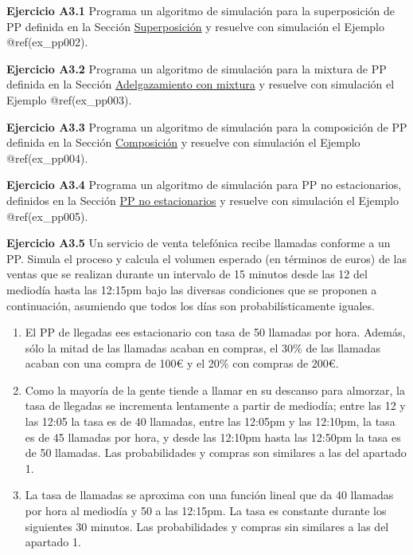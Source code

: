 \documentclass[
]{book}
\providecommand{\tightlist}{%
  \setlength{\itemsep}{0pt}\setlength{\parskip}{0pt}}
\theoremstyle{definition}
\theoremstyle{definition}
\theoremstyle{definition}
\theoremstyle{definition}
\theoremstyle{remark}
\begin{document}
\textbf{Ejercicio A3.1} Programa un algoritmo de simulación para la superposición de PP definida en la Sección \protect\hyperlink{superposicion_pp}{Superposición} y resuelve con simulación el Ejemplo @ref(ex\_pp002).

\textbf{Ejercicio A3.2} Programa un algoritmo de simulación para la mixtura de PP definida en la Sección \protect\hyperlink{adelgazamiento_pp}{Adelgazamiento con mixtura} y resuelve con simulación el Ejemplo @ref(ex\_pp003).

\textbf{Ejercicio A3.3} Programa un algoritmo de simulación para la composición de PP definida en la Sección \protect\hyperlink{composicion_pp}{Composición} y resuelve con simulación el Ejemplo @ref(ex\_pp004).

\textbf{Ejercicio A3.4} Programa un algoritmo de simulación para PP no estacionarios, definidos en la Sección \protect\hyperlink{pp_noestacionarios}{PP no estacionarios} y resuelve con simulación el Ejemplo @ref(ex\_pp005).

\textbf{Ejercicio A3.5} Un servicio de venta telefónica recibe llamadas conforme a un PP. Simula el proceso y calcula el volumen esperado (en términos de euros) de las ventas que se realizan durante un intervalo de 15 minutos desde las 12 del mediodía hasta las 12:15pm bajo las diversas condiciones que se proponen a continuación, asumiendo que todos los días son probabilísticamente iguales.

\begin{enumerate}
\def\labelenumi{\arabic{enumi}.}
\tightlist
\item
  El PP de llegadas ees estacionario con tasa de 50 llamadas por hora. Además, sólo la mitad de las llamadas acaban en compras, el 30\% de las llamadas acaban con una compra de 100€ y el 20\% con compras de 200€.
\item
  Como la mayoría de la gente tiende a llamar en su descanso para almorzar, la tasa de llegadas se incrementa lentamente a partir de mediodía; entre las 12 y las 12:05 la tasa es de 40 llamadas, entre las 12:05pm y las 12:10pm, la tasa es de 45 llamadas por hora, y desde las 12:10pm hasta las 12:50pm la tasa es de 50 llamadas. Las probabilidades y compras son similares a las del apartado 1.
\item
  La tasa de llamadas se aproxima con una función lineal que da 40 llamadas por hora al mediodía y 50 a las 12:15pm. La tasa es constante durante los siguientes 30 minutos. Las probabilidades y compras sin similares a las del apartado 1.
\end{enumerate}
\end{document}

